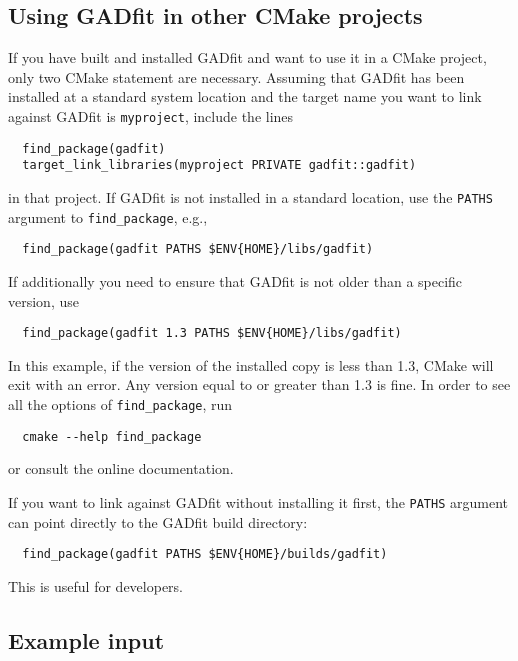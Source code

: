 \documentclass{article}
\begin{document}
\subsection{Using GADfit in other CMake projects}

If you have built and installed GADfit and want to use it in a CMake project, only two CMake statement are necessary. Assuming that GADfit has been installed at a standard system location and the target name you want to link against GADfit is \texttt{myproject}, include the lines
\begin{verbatim}
  find_package(gadfit)
  target_link_libraries(myproject PRIVATE gadfit::gadfit)
\end{verbatim}
in that project. If GADfit is not installed in a standard location, use the \texttt{PATHS} argument to \verb+find_package+, e.g.,
\begin{verbatim}
  find_package(gadfit PATHS $ENV{HOME}/libs/gadfit)
\end{verbatim}
If additionally you need to ensure that GADfit is not older than a specific version, use
\begin{verbatim}
  find_package(gadfit 1.3 PATHS $ENV{HOME}/libs/gadfit)
\end{verbatim}
In this example, if the version of the installed copy is less than 1.3, CMake will exit with an error. Any version equal to or greater than 1.3 is fine. In order to see all the options of \verb+find_package+, run
\begin{verbatim}
  cmake --help find_package
\end{verbatim}
or consult the online documentation.

If you want to link against GADfit without installing it first, the \texttt{PATHS} argument can point directly to the GADfit build directory:
\begin{verbatim}
  find_package(gadfit PATHS $ENV{HOME}/builds/gadfit)
\end{verbatim}
This is useful for developers.

\subsection{\label{sec:example}Example input}
\end{document}
